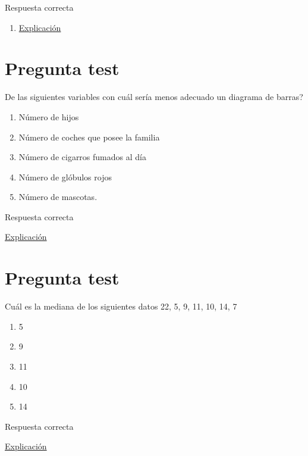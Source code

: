 \documentclass[
]{book}
\providecommand{\tightlist}{%
  \setlength{\itemsep}{0pt}\setlength{\parskip}{0pt}}
\begin{document}
Respuesta correcta

\begin{enumerate}
\def\labelenumi{\alph{enumi})}
\setcounter{enumi}{2}
\tightlist
\item
  \href{https://1fjmanzano.github.io/bioestadistica/tipos-de-variables.html}{Explicación}
\end{enumerate}

\hypertarget{pregunta-test-60}{%
\section{Pregunta test}\label{pregunta-test-60}}

De las siguientes variables con cuál sería menos adecuado un diagrama de barras?

\begin{enumerate}
\def\labelenumi{\alph{enumi})}
\tightlist
\item
  Número de hijos
\item
  Número de coches que posee la familia
\item
  Número de cigarros fumados al día
\item
  Número de glóbulos rojos
\item
  Número de mascotas.
\end{enumerate}

Respuesta correcta

\href{https://1fjmanzano.github.io/bioestadistica/representaciones-gra\%CC\%81ficas.html}{Explicación}

\hypertarget{pregunta-test-61}{%
\section{Pregunta test}\label{pregunta-test-61}}

Cuál es la mediana de los siguientes datos 22, 5, 9, 11, 10, 14, 7

\begin{enumerate}
\def\labelenumi{\alph{enumi})}
\tightlist
\item
  5
\item
  9
\item
  11
\item
  10
\item
  14
\end{enumerate}

Respuesta correcta

\href{https://1fjmanzano.github.io/bioestadistica/medidas-de-posicio\%CC\%81n-dispersio\%CC\%81n-y-forma.html\#medidas-de-posicio\%CC\%81n-centrales}{Explicación}
\end{document}

